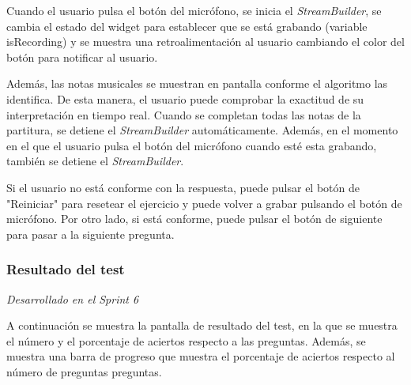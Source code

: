 Cuando el usuario pulsa el botón del micrófono, se inicia el \textit{StreamBuilder}, se cambia el estado del widget para establecer que se está grabando (variable isRecording) y se muestra una retroalimentación
al usuario cambiando el color del botón para notificar al usuario.

Además, las notas musicales se muestran en pantalla conforme el algoritmo las identifica. De esta manera, el usuario puede comprobar la exactitud de su interpretación en tiempo real.
Cuando se completan todas las notas de la partitura, se detiene el \textit{StreamBuilder} automáticamente.
Además, en el momento en el que el usuario pulsa el botón del micrófono cuando esté esta grabando, también se detiene el \textit{StreamBuilder}.

Si el usuario no está conforme con la respuesta, puede pulsar el botón de "Reiniciar" para resetear el ejercicio y puede volver a grabar pulsando el botón de micrófono. Por otro lado, si está conforme, puede pulsar el botón de siguiente para pasar a la siguiente pregunta.

\subsubsection{Resultado del test}
\label{sec:pregunta}
\textit{Desarrollado en el Sprint 6}

A continuación se muestra la pantalla de resultado del test, en la que se muestra el número y el porcentaje de aciertos respecto a las preguntas. Además, se muestra una barra de progreso que muestra el porcentaje de aciertos respecto al número de preguntas preguntas.

